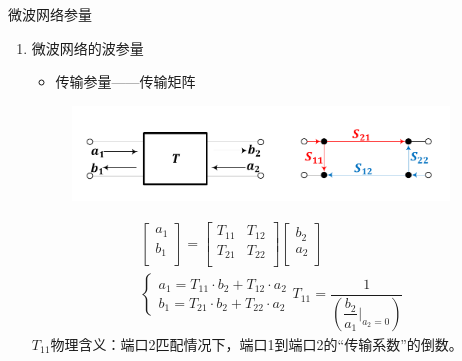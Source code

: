\begin{frame}{微波网络参量}
    \begin{enumerate}
        \resume
        \item 微波网络的波参量\\
              \begin{itemize}
                  \item 传输参量——传输矩阵
              \end{itemize}
              \begin{figure}
                  \includegraphics[width=10cm]{Cha5//fig5-12.pdf}
              \end{figure}
              \begin{gather*}
                  \begin{bmatrix*}
                      a_1 \\
                      b_1 \\
                  \end{bmatrix*}=
                  \begin{bmatrix*}
                      T_{11} & T_{12} \\
                      T_{21} & T_{22} \\
                  \end{bmatrix*}
                  \begin{bmatrix*}
                      b_2 \\
                      a_2 \\
                  \end{bmatrix*}\\
                  \begin{cases}
                      a_1 = T_{11}\cdot b_2 + T_{12}\cdot a_2 \\
                      b_1 = T_{21}\cdot b_2 + T_{22}\cdot a_2
                  \end{cases}
                  T_{11} = \dfrac{1}{\left(\dfrac{b_2}{a_1}\bigg|_{a_2=0}\right)}
              \end{gather*}
              $T_{11}$物理含义：端口2匹配情况下，端口1到端口2的“传输系数”的倒数。
    \end{enumerate}
\end{frame}

